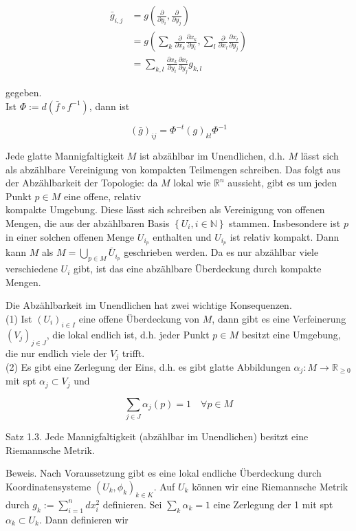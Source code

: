 \documentclass[10pt]{article}
\begin{document}
$$
\begin{aligned}
\bar{g}_{i, j} & =g\left(\frac{\partial}{\partial y_{i}}, \frac{\partial}{\partial y_{j}}\right) \\
& =g\left(\sum_{k} \frac{\partial}{\partial x_{k}} \frac{\partial x_{k}}{\partial y_{i}}, \sum_{l} \frac{\partial}{\partial x_{l}} \frac{\partial x_{l}}{\partial y_{j}}\right) \\
& =\sum_{k, l} \frac{\partial x_{k}}{\partial y_{i}} \frac{\partial x_{l}}{\partial y_{j}} g_{k, l}
\end{aligned}
$$

gegeben.\\
Ist $\Phi:=d\left(\bar{f} \circ f^{-1}\right)$, dann ist

$$
(\bar{g})_{i j}=\Phi^{-t}(g)_{k l} \Phi^{-1}
$$

Jede glatte Mannigfaltigkeit $M$ ist abzählbar im Unendlichen, d.h. $M$ lässt sich als abzählbare Vereinigung von kompakten Teilmengen schreiben. Das folgt aus der Abzählbarkeit der Topologie: da $M$ lokal wie $\mathbb{R}^{n}$ aussieht, gibt es um jeden Punkt $p \in M$ eine offene, relativ\\
kompakte Umgebung. Diese lässt sich schreiben als Vereinigung von offenen Mengen, die aus der abzählbaren Basis $\left\{U_{i}, i \in \mathbb{N}\right\}$ stammen. Insbesondere ist $p$ in einer solchen offenen Menge $U_{i_{p}}$ enthalten und $U_{i_{p}}$ ist relativ kompakt. Dann kann $M$ als $M=\bigcup_{p \in M} \bar{U}_{i_{p}}$ geschrieben werden. Da es nur abzählbar viele verschiedene $U_{i}$ gibt, ist das eine abzählbare Überdeckung durch kompakte Mengen.

Die Abzählbarkeit im Unendlichen hat zwei wichtige Konsequenzen.\\
(1) Ist $\left(U_{i}\right)_{i \in I}$ eine offene Überdeckung von $M$, dann gibt es eine Verfeinerung $\left(V_{j}\right)_{j \in J}$, die lokal endlich ist, d.h. jeder Punkt $p \in M$ besitzt eine Umgebung, die nur endlich viele der $V_{j}$ trifft.\\
(2) Es gibt eine Zerlegung der Eins, d.h. es gibt glatte Abbildungen $\alpha_{j}: M \rightarrow \mathbb{R}_{\geq 0}$ mit spt $\alpha_{j} \subset V_{j}$ und

$$
\sum_{j \in J} \alpha_{j}(p)=1 \quad \forall p \in M
$$

Satz 1.3. Jede Mannigfaltigkeit (abzählbar im Unendlichen) besitzt eine Riemannsche Metrik.

Beweis. Nach Voraussetzung gibt es eine lokal endliche Überdeckung durch Koordinatensysteme $\left(U_{k}, \phi_{k}\right)_{k \in K}$. Auf $U_{k}$ können wir eine Riemannsche Metrik durch $g_{k}:=\sum_{i=1}^{n} d x_{i}^{2}$ definieren. Sei $\sum_{k} \alpha_{k}=1$ eine Zerlegung der 1 mit spt $\alpha_{k} \subset U_{k}$. Dann definieren wir
\end{document}
